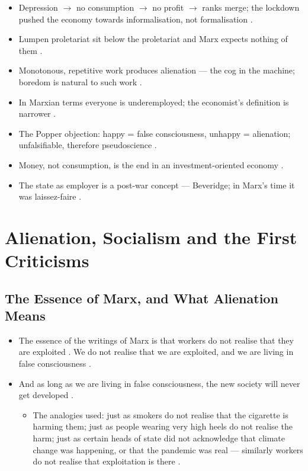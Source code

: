 \begin{QuickRevision}
\begin{itemize}
    \item Depression $\rightarrow$ no consumption $\rightarrow$ no profit $\rightarrow$ ranks merge; the lockdown pushed the economy towards informalisation, not formalisation .
    \item Lumpen proletariat sit below the proletariat and Marx expects nothing of them .
    \item Monotonous, repetitive work produces alienation --- the cog in the machine; boredom is natural to such work .
    \item In Marxian terms everyone is underemployed; the economist's definition is narrower .
    \item The Popper objection: happy = false consciousness, unhappy = alienation; unfalsifiable, therefore pseudoscience .
    \item Money, not consumption, is the end in an investment-oriented economy .
    \item The state as employer is a post-war concept --- Beveridge; in Marx's time it was laissez-faire .
\end{itemize}
\end{QuickRevision}

\sectiondivider

\section{Alienation, Socialism and the First Criticisms}

\subsection{The Essence of Marx, and What Alienation Means}
\begin{itemize}
    \item The essence of the writings of Marx is that workers do not realise that they are exploited . We do not realise that we are exploited, and we are living in false consciousness .
    \item And as long as we are living in false consciousness, the new society will never get developed .
    \begin{itemize}
        \item The analogies used: just as smokers do not realise that the cigarette is harming them; just as people wearing very high heels do not realise the harm; just as certain heads of state did not acknowledge that climate change was happening, or that the pandemic was real --- similarly workers do not realise that exploitation is there .
    \end{itemize}
\end{itemize}

